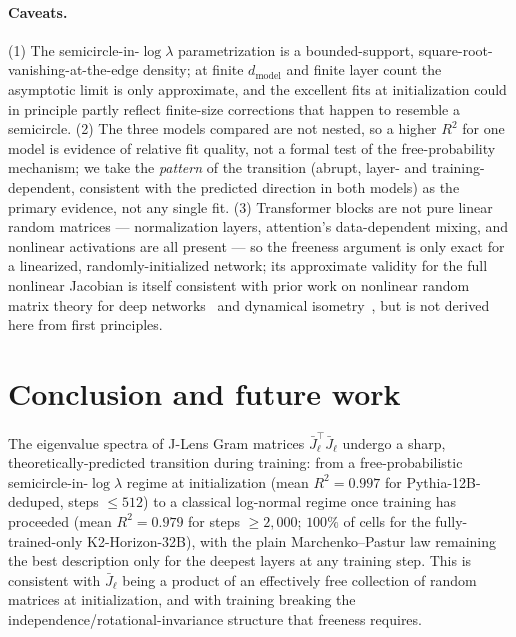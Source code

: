 \documentclass[11pt,a4paper]{article}
\begin{document}
\paragraph{Caveats.} (1) The semicircle-in-$\log\lambda$ parametrization is a bounded-support, square-root-vanishing-at-the-edge density; at finite $d_{\mathrm{model}}$ and finite layer count the asymptotic limit is only approximate, and the excellent fits at initialization could in principle partly reflect finite-size corrections that happen to resemble a semicircle. (2) The three models compared are not nested, so a higher $R^2$ for one model is evidence of relative fit quality, not a formal test of the free-probability mechanism; we take the \emph{pattern} of the transition (abrupt, layer- and training-dependent, consistent with the predicted direction in both models) as the primary evidence, not any single fit. (3) Transformer blocks are not pure linear random matrices --- normalization layers, attention's data-dependent mixing, and nonlinear activations are all present --- so the freeness argument is only exact for a linearized, randomly-initialized network; its approximate validity for the full nonlinear Jacobian is itself consistent with prior work on nonlinear random matrix theory for deep networks~\cite{pennington2017nonlinear} and dynamical isometry~\cite{pennington2017}, but is not derived here from first principles.

\section{Conclusion and future work}

The eigenvalue spectra of J-Lens Gram matrices $\bar{J}_\ell^\top\bar{J}_\ell$ undergo a sharp, theoretically-predicted transition during training: from a free-probabilistic semicircle-in-$\log\lambda$ regime at initialization (mean $R^2=0.997$ for Pythia-12B-deduped, steps $\leq 512$) to a classical log-normal regime once training has proceeded (mean $R^2=0.979$ for steps $\geq 2{,}000$; $100\%$ of cells for the fully-trained-only K2-Horizon-32B), with the plain Marchenko--Pastur law remaining the best description only for the deepest layers at any training step. This is consistent with $\bar{J}_\ell$ being a product of an effectively free collection of random matrices at initialization, and with training breaking the independence/rotational-invariance structure that freeness requires.
\end{document}
